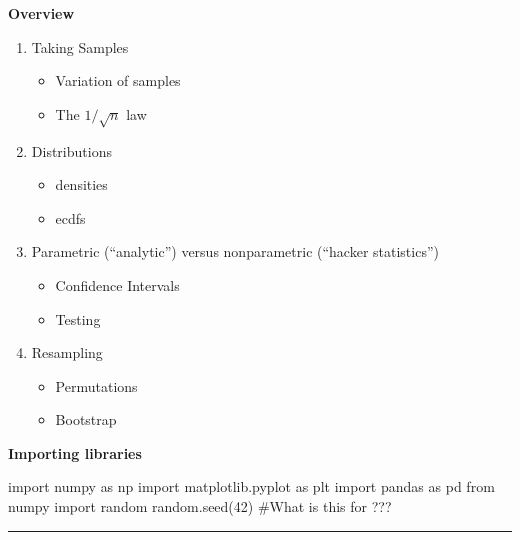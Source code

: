 \documentclass[
  letterpaper,
  DIV=11,
  numbers=noendperiod]{scrreprt}
\newenvironment{Shaded}{\begin{snugshade}}{\end{snugshade}}
\newcommand{\CommentTok}[1]{\textcolor[rgb]{0.37,0.37,0.37}{#1}}
\newcommand{\DecValTok}[1]{\textcolor[rgb]{0.68,0.00,0.00}{#1}}
\newcommand{\ImportTok}[1]{\textcolor[rgb]{0.00,0.46,0.62}{#1}}
\newcommand{\NormalTok}[1]{\textcolor[rgb]{0.00,0.23,0.31}{#1}}
\providecommand{\tightlist}{%
  \setlength{\itemsep}{0pt}\setlength{\parskip}{0pt}}\usepackage{longtable,booktabs,array}
\begin{document}
\textbf{Overview}

\begin{enumerate}
\def\labelenumi{\arabic{enumi}.}
\tightlist
\item
  Taking Samples

  \begin{itemize}
  \tightlist
  \item
    Variation of samples
  \item
    The \(1/\sqrt{n}\) law
  \end{itemize}
\item
  Distributions

  \begin{itemize}
  \tightlist
  \item
    densities
  \item
    ecdfs
  \end{itemize}
\item
  Parametric (``analytic'') versus nonparametric (``hacker statistics'')

  \begin{itemize}
  \tightlist
  \item
    Confidence Intervals
  \item
    Testing
  \end{itemize}
\item
  Resampling

  \begin{itemize}
  \tightlist
  \item
    Permutations
  \item
    Bootstrap
  \end{itemize}
\end{enumerate}

\textbf{Importing libraries}

\begin{Shaded}
\begin{Highlighting}[]
\ImportTok{import}\NormalTok{ numpy }\ImportTok{as}\NormalTok{ np}
\ImportTok{import}\NormalTok{ matplotlib.pyplot }\ImportTok{as}\NormalTok{ plt}
\ImportTok{import}\NormalTok{ pandas }\ImportTok{as}\NormalTok{ pd}
\ImportTok{from}\NormalTok{ numpy }\ImportTok{import}\NormalTok{ random }
\NormalTok{random.seed(}\DecValTok{42}\NormalTok{) }\CommentTok{\#What is this for ???}
\end{Highlighting}
\end{Shaded}

\begin{center}\rule{0.5\linewidth}{0.5pt}\end{center}
\end{document}
